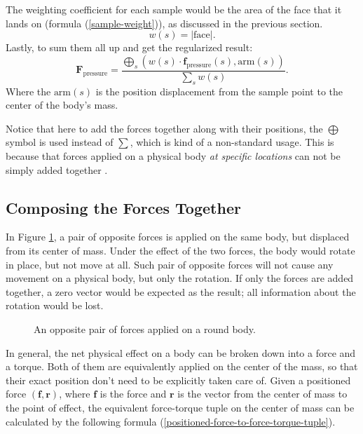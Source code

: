 The weighting coefficient for each sample would be the area of the face that it lands on (formula (\ref{sample-weight})), as discussed in the previous section.
\begin{equation}
	w(s)=|\text{face}|.
	\label{sample-weight}
\end{equation}
Lastly, to sum them all up and get the regularized result:
\begin{equation}
	\mathbf{F}_{\text{pressure}}=\frac
		{
			\bigoplus_{s}
			\left(
				w(s)\cdot\mathbf{f}_{\text{pressure}}(s)
				,
				\text{arm}(s)
			\right)
		}
		{\sum_{s}w(s)}.
	\label{net-pressure-force}
\end{equation}
Where the $\text{arm}(s)$ is the position displacement from the sample point to the center of the body's mass.

Notice that here to add the forces together along with their positions, the $\bigoplus$ symbol is used instead of $\sum$, which is kind of a non-standard usage.
This is because that forces applied on a physical body \emph{at specific locations} can not be simply added together \cite{mirtich1996impulse}.

\subsection{Composing the Forces Together}

In Figure \ref{force-pair}, a pair of opposite forces is applied on the same body, but displaced from its center of mass.
Under the effect of the two forces, the body would rotate in place, but not move at all.
Such pair of opposite forces will not cause any movement on a physical body, but only the rotation.
If only the forces are added together, a zero vector would be expected as the result; all information about the rotation would be lost.

\begin{figure}[h]
	\centering
	\scalebox{0.8}{
		\begin{tikzpicture}
			\filldraw[color=black, fill=lightgray, line width=1pt] (0,0) circle (2);
			\draw[-latex, line width=1pt] (2,0) -- ++(0,-2);
			\draw[-latex, line width=1pt] (-2,0) -- ++(0,+2);
		\end{tikzpicture}
	}
	\caption{An opposite pair of forces applied on a round body.}
	\label{force-pair}
\end{figure}

In general, the net physical effect on a body can be broken down into a force and a torque.
Both of them are equivalently applied on the center of the mass, so that their exact position don't need to be explicitly taken care of.
Given a positioned force $(\mathbf{f}, \mathbf{r})$, where $\mathbf{f}$ is the force and $\mathbf{r}$ is the vector from the center of mass to the point of effect, the equivalent force-torque tuple on the center of mass can be calculated by the following formula (\ref{positioned-force-to-force-torque-tuple}).

